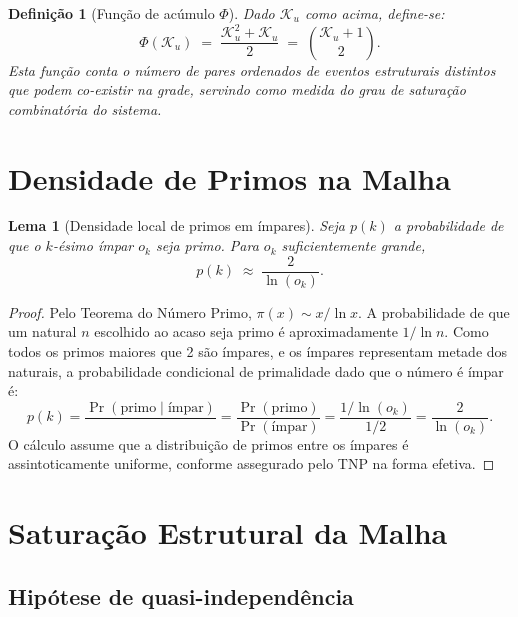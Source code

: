 \documentclass{article}
\newtheorem{lemma}[proposition]{Lema}
\newtheorem{definition}[proposition]{Definição}
\begin{document}
	\begin{definition}[Função de acúmulo $\Phi$]
		\label{def:phi}
		Dado $\mathcal{K}_u$ como acima, define-se:
		\[
		\Phi(\mathcal{K}_u)
		\;=\; \frac{\mathcal{K}_u^2 + \mathcal{K}_u}{2}
		\;=\; \binom{\mathcal{K}_u + 1}{2}.
		\]
		Esta função conta o número de \emph{pares ordenados} de eventos
		estruturais distintos que podem co-existir na grade, servindo
		como medida do grau de saturação combinatória do sistema.
	\end{definition}
	
	\section{Densidade de Primos na Malha}
	\label{sec:densidade}
	
	\begin{lemma}[Densidade local de primos em ímpares]
		\label{lem:densidade}
		Seja $p(k)$ a probabilidade de que o $k$-ésimo ímpar $o_k$
		seja primo. Para $o_k$ suficientemente grande,
		\[
		p(k) \;\approx\; \frac{2}{\ln(o_k)}.
		\]
	\end{lemma}
	
	\begin{proof}
		Pelo Teorema do Número Primo, $\pi(x) \sim x/\ln x$.
		A probabilidade de que um natural $n$ escolhido ao acaso seja
		primo é aproximadamente $1/\ln n$. Como todos os primos maiores
		que 2 são ímpares, e os ímpares representam metade dos naturais,
		a probabilidade condicional de primalidade dado que o número é
		ímpar é:
		\[
		p(k) = \frac{\Pr(\text{primo} \mid \text{ímpar})}{}
		= \frac{\Pr(\text{primo})}{\Pr(\text{ímpar})}
		= \frac{1/\ln(o_k)}{1/2}
		= \frac{2}{\ln(o_k)}.
		\]
		O cálculo assume que a distribuição de primos entre os ímpares
		é assintoticamente uniforme, conforme assegurado pelo
		TNP na forma efetiva.
	\end{proof}
	
	\section{Saturação Estrutural da Malha}
	\label{sec:saturacao}
	
	\subsection{Hipótese de quasi-independência}
	
\end{document}
